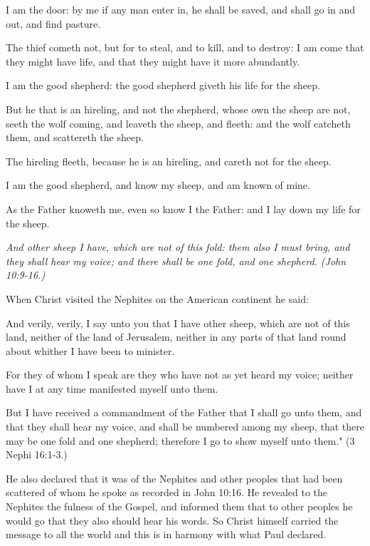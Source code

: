 I am the door: by me if any man enter in, he shall be saved, and shall go in and out, and find
pasture.

The thief cometh not, but for to steal, and to kill, and to destroy: I am come that they might
have life, and that they might have it more abundantly.

I am the good shepherd: the good shepherd giveth his life for the sheep.

But he that is an hireling, and not the shepherd, whose own the sheep are not, seeth the wolf
coming, and leaveth the sheep, and fleeth: and the wolf catcheth them, and scattereth the
sheep.

The hireling fleeth, because he is an hireling, and careth not for the sheep.

I am the good shepherd, and know my sheep, and am known of mine.

As the Father knoweth me, even so know I the Father: and I lay down my life for the sheep.

\textit{And other sheep I have, which are not of this fold: them also I must bring, and they shall
hear my voice; and there shall be one fold, and one shepherd. (John 10:9-16.)}

When Christ visited the Nephites on the American continent he said:

And verily, verily, I say unto you that I have other sheep, which are not of this land, neither
of the land of Jerusalem, neither in any parts of that land round about whither I have been to
minister.

For they of whom I speak are they who have not as yet heard my voice; neither have I at any
time manifested myself unto them.

But I have received a commandment of the Father that I shall go unto them, and that they
shall hear my voice, and shall be numbered among my sheep, that there may be one fold and
one shepherd; therefore I go to show myself unto them." (3 Nephi 16:1-3.)

He also declared that it was of the Nephites and other peoples that had been scattered of
whom he spoke as recorded in John 10:16. He revealed to the Nephites the fulness of the
Gospel, and informed them that to other peoples he would go that they also should hear his
words. So Christ himself carried the message to all the world and this is in harmony with
what Paul declared.

